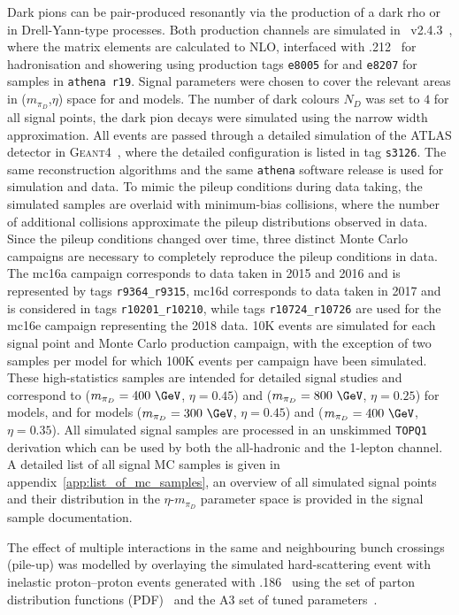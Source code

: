 Dark pions can be pair-produced resonantly via the production of a dark rho or in Drell-Yann-type processes.
Both production channels are simulated in \mgamc~v2.4.3~\cite{Alwall:2014hca}, where the matrix elements are calculated to NLO, interfaced with \pythia.212~\cite{Sjostrand:2007gs} for hadronisation and showering using production tags \texttt{e8005} for \sul and \texttt{e8207} for \sur samples in \texttt{athena r19}.
Signal parameters were chosen to cover the relevant areas in ($m_{\pi_D}$,$\eta$) space for \sul and \sur models.
The number of dark colours $N_D$ was set to $4$ for all signal points, the dark pion decays were simulated using the narrow width approximation.
All events are passed through a detailed simulation of the ATLAS detector in \textsc{Geant4}~\cite{Agostinelli:2002hh,SOFT-2010-01}, where the detailed configuration is listed in tag \texttt{s3126}.
The same reconstruction algorithms and the same \texttt{athena} software release is used for simulation and data.
To mimic the pileup conditions during data taking, the simulated samples are overlaid with minimum-bias collisions, where the number of additional collisions approximate the pileup distributions observed in data.
Since the pileup conditions changed over time, three distinct Monte Carlo campaigns are necessary to completely reproduce the pileup conditions in data.
The mc16a campaign corresponds to data taken in 2015 and 2016 and is represented by tags \texttt{r9364\_r9315}, mc16d corresponds to data taken in 2017 and is considered in tags \texttt{r10201\_r10210}, while tags \texttt{r10724\_r10726} are used for the mc16e campaign representing the 2018 data.
10K events are simulated for each signal point and Monte Carlo production campaign, with the exception of two samples per model for which 100K events per campaign have been simulated.
These high-statistics samples are intended for detailed signal studies and correspond to ($m_{\pi_D}=400~\GeV$, $\eta=0.45$) and ($m_{\pi_D}=800~\GeV$, $\eta=0.25$) for \sul models, and for \sur models ($m_{\pi_D}=300~\GeV$, $\eta=0.45$) and ($m_{\pi_D}=400~\GeV$, $\eta=0.35$).
All simulated signal samples are processed in an unskimmed \texttt{TOPQ1} derivation which can be used by both the all-hadronic and the 1-lepton channel. 
A detailed list of all signal MC samples is given in appendix~\ref{app:list_of_mc_samples}, an overview of all simulated signal points and their distribution in the $\eta$-$m_{\pi_D}$ parameter space is provided in the signal sample documentation.

The effect of multiple interactions in the same and neighbouring bunch crossings (pile-up) was modelled by overlaying the simulated hard-scattering event with inelastic proton--proton events generated with \pythia.186~\cite{Sjostrand:2007gs} using the \nnpdftwo set of parton distribution functions (PDF)~\cite{Ball2013} and the \textsc{A3} set of tuned parameters~\cite{ATL-PHYS-PUB-2016-017}.

